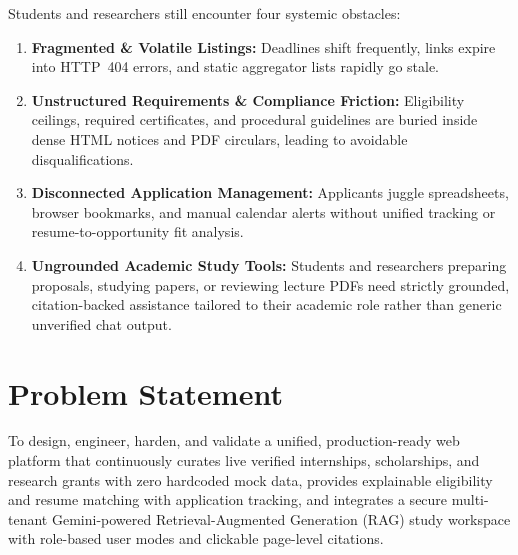 \documentclass[12pt,a4paper,oneside]{report}
\begin{document}
Students and researchers still encounter four systemic obstacles:
\begin{enumerate}[itemsep=2pt]
    \item \textbf{Fragmented \& Volatile Listings:} Deadlines shift frequently, links expire into HTTP~404 errors, and static aggregator lists rapidly go stale.
    \item \textbf{Unstructured Requirements \& Compliance Friction:} Eligibility ceilings, required certificates, and procedural guidelines are buried inside dense HTML notices and PDF circulars, leading to avoidable disqualifications.
    \item \textbf{Disconnected Application Management:} Applicants juggle spreadsheets, browser bookmarks, and manual calendar alerts without unified tracking or resume-to-opportunity fit analysis.
    \item \textbf{Ungrounded Academic Study Tools:} Students and researchers preparing proposals, studying papers, or reviewing lecture PDFs need strictly grounded, citation-backed assistance tailored to their academic role rather than generic unverified chat output.
\end{enumerate}

\section{Problem Statement}
To design, engineer, harden, and validate a unified, production-ready web platform that continuously curates live verified internships, scholarships, and research grants with zero hardcoded mock data, provides explainable eligibility and resume matching with application tracking, and integrates a secure multi-tenant Gemini-powered Retrieval-Augmented Generation (RAG) study workspace with role-based user modes and clickable page-level citations.
\end{document}
